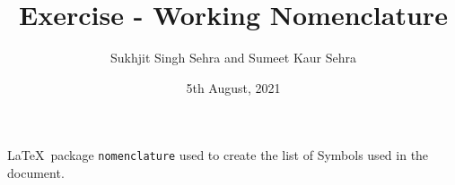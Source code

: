 \documentclass[11pt,a4paper]{article}
\title{Exercise - Working Nomenclature}
\author{Sukhjit Singh Sehra and Sumeet Kaur Sehra}
\date{5th August, 2021}
\begin{document}
\maketitle
\tableofcontents
{}
\LaTeX\ package \verb|nomenclature| used to create the list of Symbols used in the document. 
 

\printnomenclature
\end{document}
